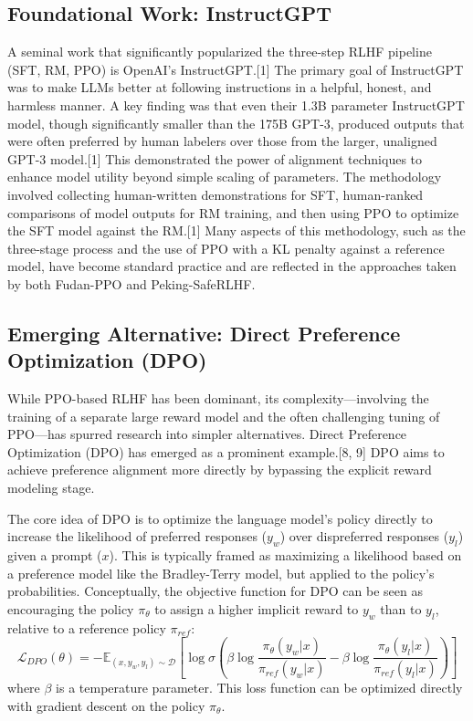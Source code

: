 \documentclass[10pt,journal,compsoc]{IEEEtran} %
\begin{document}
\subsection{Foundational Work: InstructGPT}
A seminal work that significantly popularized the three-step RLHF pipeline (SFT, RM, PPO) is OpenAI's InstructGPT.[1] The primary goal of InstructGPT was to make LLMs better at following instructions in a helpful, honest, and harmless manner. A key finding was that even their 1.3B parameter InstructGPT model, though significantly smaller than the 175B GPT-3, produced outputs that were often preferred by human labelers over those from the larger, unaligned GPT-3 model.[1] This demonstrated the power of alignment techniques to enhance model utility beyond simple scaling of parameters. The methodology involved collecting human-written demonstrations for SFT, human-ranked comparisons of model outputs for RM training, and then using PPO to optimize the SFT model against the RM.[1] Many aspects of this methodology, such as the three-stage process and the use of PPO with a KL penalty against a reference model, have become standard practice and are reflected in the approaches taken by both Fudan-PPO and Peking-SafeRLHF.

\subsection{Emerging Alternative: Direct Preference Optimization (DPO)}
While PPO-based RLHF has been dominant, its complexity—involving the training of a separate large reward model and the often challenging tuning of PPO—has spurred research into simpler alternatives. Direct Preference Optimization (DPO) has emerged as a prominent example.[8, 9] DPO aims to achieve preference alignment more directly by bypassing the explicit reward modeling stage.

The core idea of DPO is to optimize the language model's policy directly to increase the likelihood of preferred responses ($y_w$) over dispreferred responses ($y_l$) given a prompt ($x$). This is typically framed as maximizing a likelihood based on a preference model like the Bradley-Terry model, but applied to the policy's probabilities. Conceptually, the objective function for DPO can be seen as encouraging the policy $\pi_\theta$ to assign a higher implicit reward to $y_w$ than to $y_l$, relative to a reference policy $\pi_{ref}$:
$$ \mathcal{L}_{DPO}(\theta) = -\mathbb{E}_{(x, y_w, y_l) \sim \mathcal{D}} \left[\log \sigma\left(\beta \log \frac{\pi_\theta(y_w|x)}{\pi_{ref}(y_w|x)} - \beta \log \frac{\pi_\theta(y_l|x)}{\pi_{ref}(y_l|x)}\right)\right] $$
where $\beta$ is a temperature parameter. This loss function can be optimized directly with gradient descent on the policy $\pi_\theta$.
\end{document}
